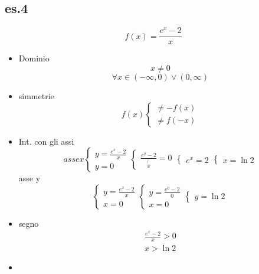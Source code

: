\documentclass{article}
\begin{document}
	\subsection{es.4}
	\begin{equation*}
		f(x)=\frac{e^x-2}{x}
	\end{equation*}
	\begin{itemize}
		\item Dominio
		\begin{equation*}
			x\neq 0
		\end{equation*}
		\begin{equation*}
				\forall x \in (-\infty, 0) \vee (0,\infty)
		\end{equation*}
		\item simmetrie 
			\begin{equation*}
				f(x)\begin{cases}
					\neq -f(x)\\
					\neq f(-x)
				\end{cases}
			\end{equation*}
		\item Int. con gli assi
			\begin{equation*}
				asse x\begin{cases}
					y=\frac{e^x-2}{x}\\
					y=0
				\end{cases}\begin{cases}
					\frac{e^2-2}{\not{x}}=0
				\end{cases}\begin{cases}
					e^x=2
				\end{cases}\begin{cases}
					x=\ln 2
				\end{cases}
			\end{equation*}
			asse y\begin{equation*}
				\begin{cases}
					y=\frac{e^x-2}{x}\\
					x=0
				\end{cases}\begin{cases}
					y=\frac{e^0-2}{0}\\
					x=0
				\end{cases}\begin{cases}
					y=\ln2
				\end{cases}
			\end{equation*}
		\item segno
			\begin{equation*}
				\begin{matrix}
					\frac{e^x-2}{x}>0\\
					x>\ln 2
				\end{matrix}
			\end{equation*}
		\item 
	\end{itemize}
\end{document}

